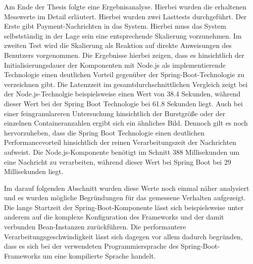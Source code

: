 Am Ende der Thesis folgte eine Ergebnisanalyse. Hierbei wurden die erhaltenen Messwerte im Detail erläutert. Hierbei wurden zwei Lasttests durchgeführt. Der Erste gibt Payment-Nachrichten in das System. Hierbei muss das System selbstständig in der Lage sein eine entsprechende Skalierung vorzunehmen. Im zweiten Test wird die Skalierung als Reaktion auf direkte Anweisungen des Benutzers vorgenommen. Die Ergebnisse hierbei zeigen, dass es hinsichtlich der Initialisierungsdauer der Komponenten mit Node.js als implementierende Technologie einen deutlichen Vorteil gegenüber der Spring-Boot-Technologie zu verzeichnen gibt. Die Latenzzeit im gesamtdurchschnittlichen Vergleich zeigt bei der Node.js-Technolgie beispielsweise einen Wert von 38.4 Sekunden, während dieser Wert bei der Spring Boot Technologie bei 61.8 Sekunden liegt. Auch bei einer feingranulareren Untersuchung hinsichtlich der Burstgröße oder der einzelnen Containeranzahlen ergibt sich ein ähnliches Bild. Dennoch gilt es noch hervorzuheben, dass die Spring Boot Technologie einen deutlichen Performancevorteil hinsichtlich der reinen Verarbeitungszeit der Nachrichten aufweist. Die Node.js-Komponente benötigt im Schnitt 388 Millisekunden um eine Nachricht zu verarbeiten, während dieser Wert bei Spring Boot bei 29 Millisekunden liegt. 

Im darauf folgenden Abschnitt wurden diese Werte noch einmal näher analysiert und es wurden mögliche Begründungen für das gemessene Verhalten aufgezeigt. Die lange Startzeit der Spring-Boot-Komponente lässt sich beispielsweise unter anderem auf die komplexe Konfiguration des Frameworks und der damit verbunden Bean-Instanzen zurückführen. Die performantere Verarbeitungsgeschwindigkeit lässt sich dagegen vor allem dadurch begründen, dass es sich bei der verwendeten Programmiersprache des Spring-Boot-Frameworks um eine kompilierte Sprache handelt.